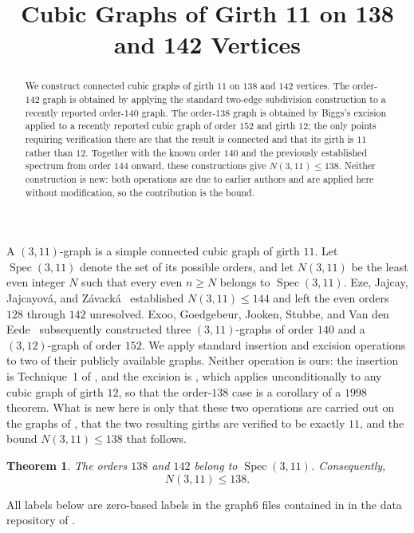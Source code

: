 \documentclass[11pt]{amsart}
\title{Cubic Graphs of Girth 11 on 138 and 142 Vertices}
\date{}
\newtheorem{theorem}{Theorem}
\newcommand{\Spec}{\operatorname{Spec}}
\begin{document}
\begin{abstract}
We construct connected cubic graphs of girth $11$ on $138$ and $142$
vertices. The order-$142$ graph is obtained by applying the standard
two-edge subdivision construction to a recently reported order-$140$
graph. The order-$138$ graph is obtained by Biggs's excision
\cite[Theorem~4.2]{Biggs} applied to a recently reported cubic graph of
order $152$ and girth $12$; the only points requiring verification there
are that the result is connected and that its girth is $11$ rather than
$12$. Together with the
known order $140$ and the previously established spectrum from order
$144$ onward, these constructions give $N(3,11)\leq 138$. Neither
construction is new: both operations are due to earlier authors and are
applied here without modification, so the contribution is the bound.
\end{abstract}

\maketitle

A $(3,11)$-graph is a simple connected cubic graph of girth $11$.
Let $\Spec(3,11)$ denote the set of its possible orders, and let
$N(3,11)$ be the least even integer $N$ such that every even $n\geq N$
belongs to $\Spec(3,11)$. Eze, Jajcay, Jajcayov\'a, and
Z\'avack\'a~\cite{EzeEtAl} established $N(3,11)\leq 144$ and left the
even orders $128$ through $142$ unresolved. Exoo, Goedgebeur, Jooken,
Stubbe, and Van den Eede~\cite{ExooEtAl} subsequently constructed three
$(3,11)$-graphs of order $140$ and a $(3,12)$-graph of order $152$.
We apply standard insertion and excision operations to two of their
publicly available graphs. Neither operation is ours: the insertion is
Technique~1 of \cite[Section~5.1]{EzeEtAl}, and the excision is
\cite[Theorem~4.2]{Biggs}, which applies unconditionally to any cubic
graph of girth $12$, so that the order-$138$ case is a corollary of a
$1998$ theorem. What is new here is only that these two operations are
carried out on the graphs of \cite{ExooEtAl}, that the two resulting
girths are verified to be exactly $11$, and the bound
$N(3,11)\leq 138$ that follows.

\begin{theorem}\label{thm:main}
The orders $138$ and $142$ belong to $\Spec(3,11)$. Consequently,
\[
N(3,11)\leq 138.
\]
\end{theorem}

All labels below are zero-based labels in the graph6 files contained in
 in the data repository of
\cite{ExooEtAl}.
\end{document}
